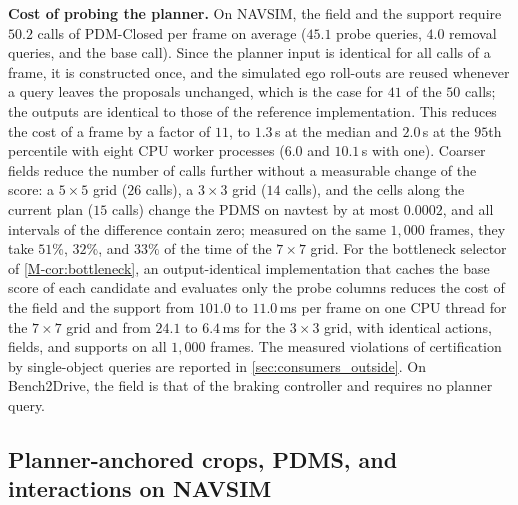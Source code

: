 \documentclass[10pt,letterpaper]{article}
\theoremstyle{remark}
\theoremstyle{plain}
\theoremstyle{definition}
\begin{document}
\noindent\textbf{Cost of probing the planner.}
On NAVSIM, the field and the support require $50.2$ calls of PDM-Closed per frame on average ($45.1$ probe queries, $4.0$ removal queries, and the base call).
Since the planner input is identical for all calls of a frame, it is constructed once, and the simulated ego roll-outs are reused whenever a query leaves the proposals unchanged, which is the case for $41$ of the $50$ calls; the outputs are identical to those of the reference implementation.
This reduces the cost of a frame by a factor of $11$, to $1.3$\,s at the median and $2.0$\,s at the $95$th percentile with eight CPU worker processes ($6.0$ and $10.1$\,s with one).
Coarser fields reduce the number of calls further without a measurable change of the score: a $5\times5$ grid ($26$ calls), a $3\times3$ grid ($14$ calls), and the cells along the current plan ($15$ calls) change the PDMS on navtest by at most $0.0002$, and all intervals of the difference contain zero; measured on the same $1{,}000$ frames, they take $51\%$, $32\%$, and $33\%$ of the time of the $7\times7$ grid.
For the bottleneck selector of \cref*{M-cor:bottleneck}, an output-identical implementation that caches the base score of each candidate and evaluates only the probe columns reduces the cost of the field and the support from $101.0$ to $11.0$\,ms per frame on one CPU thread for the $7\times7$ grid and from $24.1$ to $6.4$\,ms for the $3\times3$ grid, with identical actions, fields, and supports on all $1{,}000$ frames.
The measured violations of certification by single-object queries are reported in \cref{sec:consumers_outside}.
On Bench2Drive, the field is that of the braking controller and requires no planner query.

\subsection{Planner-anchored crops, PDMS, and interactions on NAVSIM}
\label{sec:supp_navsim_k41}
\end{document}
